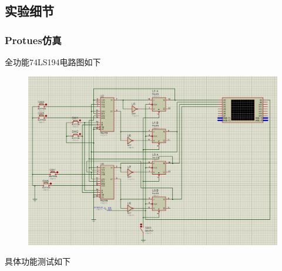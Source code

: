\documentclass[11pt,UTF8]{ctexart}
\begin{document}
\subsection{实验细节}
\subsubsection{Protues仿真}
\par 全功能74LS194电路图如下
\begin{figure}[H]
    \centering
    \includegraphics[width=0.6\linewidth]{fig/74ls194.PNG}
\end{figure}
\par 具体功能测试如下
\end{document}
